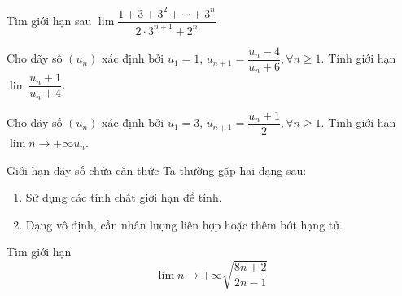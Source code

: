 \begin{bt}%
	Tìm giới hạn sau $\lim\dfrac{1+3+3^2+\cdots +3^n}{2\cdot 3^{n+1}+2^n}$
\end{bt}
\begin{bt}%
	Cho dãy số $(u_n)$ xác định bởi $u_1=1$, $u_{n+1}=\dfrac{u_n-4}{u_n+6}, \forall n\geq 1$. Tính giới hạn $\lim\dfrac{u_n+1}{u_n+4}$.
\end{bt}

\begin{bt}%
	Cho dãy số $(u_n)$ xác định bởi $u_1=3$, $u_{n+1}=\dfrac{u_n+1}{2}, \forall n\geq 1$. Tính giới hạn $\lim \limits{n \to +\infty}u_n$.
\end{bt}

\begin{dang}{Giới hạn dãy số chứa căn thức}
	Ta thường gặp hai dạng sau:
	\begin{enumerate}[Dạng 1.]
		\item Sử dụng các tính chất giới hạn để tính.
		\item Dạng vô định, cần nhân lượng liên hợp hoặc thêm bớt hạng tử.
	\end{enumerate}
\end{dang}
\begin{vd}%
	Tìm giới hạn $$\lim \limits{n \to +\infty}\sqrt{\dfrac{8n+2}{2n-1}} $$
\end{vd}

